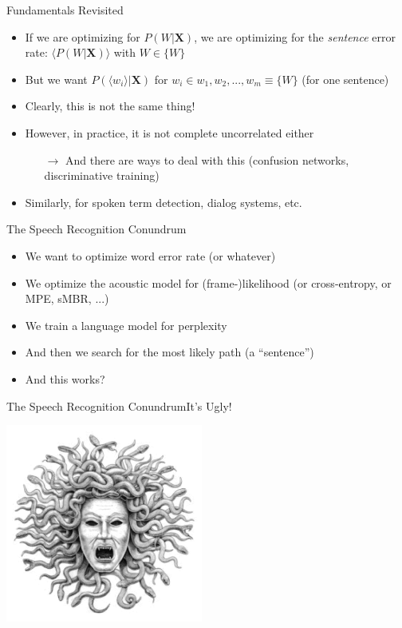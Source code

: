 \begin{frame}{Fundamentals Revisited}
  \begin{itemize}
  \item If we are optimizing for $P(W|\boldsymbol{X})$,
    we are optimizing for the \textit{sentence} error rate: $\langle P(W|\boldsymbol{X}) \rangle$ with $W \in \{W\}$
  \item But we want $P(\langle w_i \rangle|\boldsymbol{X})$ for $w_i \in w_1,w_2, ..., w_m \equiv \{W\}$ (for one sentence)
  \item Clearly, this is not the same thing!
  \item However, in practice, it is not complete uncorrelated either
    \begin{itemize}
    \item[$\rightarrow$] And there are ways to deal with this (confusion networks, discriminative training)
    \end{itemize}
  \item Similarly, for spoken term detection, dialog systems, etc.
  \end{itemize}
\end{frame}

\begin{frame}{The Speech Recognition Conundrum}
  \begin{itemize}
  \item We want to optimize word error rate (or whatever)\\
    \vspace{1cm}
  \item We optimize the acoustic model for (frame-)likelihood (or cross-entropy, or MPE, sMBR, ...)
  \item We train a language model for perplexity
  \item And then we search for the most likely path (a ``sentence'')
  \item And this works?
  \end{itemize}
\end{frame}

\begin{frame}{The Speech Recognition Conundrum}{It's Ugly!}
  \begin{center}
    \includegraphics[height=65mm]{figures/medusa}
  \end{center}
\end{frame}

